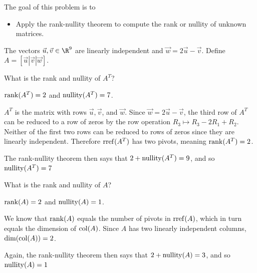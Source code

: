 	\question
	\begin{annotation}
		\begin{goals}

			The goal of this problem is to
			\begin{itemize}
				\item Apply the rank-nullity theorem to compute the rank or nullity of unknown matrices.
			\end{itemize}
		\end{goals}
	\end{annotation}
	The vectors $\vec u,\vec v\in\R^9$ are linearly independent and $\vec w=2\vec u-\vec v$.
	Define $A=[\vec u|\vec v|\vec w]$.
	\begin{parts}
		\item What is the rank and nullity of $A^T$?
			\begin{solution}
				$\operatorname{rank}(A^T)=2$ and $\operatorname{nullity}(A^T)=7$.

				$A^T$ is the matrix with rows $\vec u,\vec v$, and $\vec w$.
				Since $\vec w=2\vec u-\vec v$, the third row of $A^T$ can be
				reduced to a row of zeros by the row operation
				$R_3\mapsto R_3-2R_1+R_2$. Neither of the first two rows can be
				reduced to rows of zeros since they are linearly independent.
				Therefore $\operatorname{rref}(A^T)$ has two pivots, meaning $\operatorname{rank}(A^T)=2$.

				The rank-nullity theorem then says that $2+\operatorname{nullity}(A^T)=9$, and so
				$\operatorname{nullity}(A^T)=7$
			\end{solution}
		\item What is the rank and nullity of $A$?
			\begin{solution}
				$\operatorname{rank}(A)=2$ and $\operatorname{nullity}(A)=1$.

				We know that $\operatorname{rank}(A)$ equals the number of pivots in $\operatorname{rref}(A)$,
				which in turn equals the dimension of $\operatorname{col}(A)$. Since $A$ has two
				linearly independent columns, $\operatorname{dim}(\operatorname{col}(A))=2$.

				Again, the rank-nullity theorem then says that $2+\operatorname{nullity}(A)=3$,
				and so $\operatorname{nullity}(A)=1$
			\end{solution}
	\end{parts}







